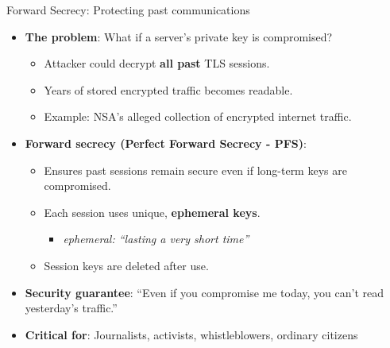 \documentclass[aspectratio=169, lualatex, handout]{beamer}
\begin{document}
\begin{frame}{Forward Secrecy: Protecting past communications}
	\begin{itemize}
		\item \textbf{The problem}: What if a server's private key is compromised?
		      \begin{itemize}
			      \item Attacker could decrypt \textbf{all past} TLS sessions.
			      \item Years of stored encrypted traffic becomes readable.
			      \item Example: NSA's alleged collection of encrypted internet traffic.
		      \end{itemize}
		\item \textbf{Forward secrecy (Perfect Forward Secrecy - PFS)}:
		      \begin{itemize}
			      \item Ensures past sessions remain secure even if long-term keys are compromised.
			      \item Each session uses unique, \textbf{ephemeral keys}.
			            \begin{itemize}
				            \item \textit{ephemeral: ``lasting a very short time''}
			            \end{itemize}
			      \item Session keys are deleted after use.
		      \end{itemize}
		\item \textbf{Security guarantee}: ``Even if you compromise me today, you can't read yesterday's traffic.''
		\item \textbf{Critical for}: Journalists, activists, whistleblowers, ordinary citizens
	\end{itemize}
\end{frame}
\end{document}
